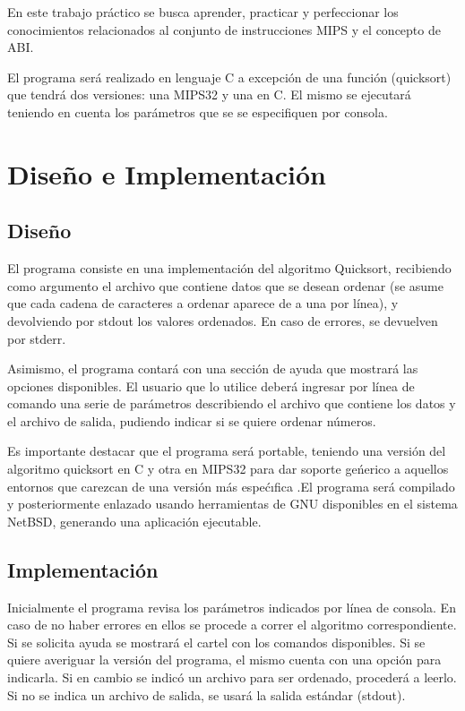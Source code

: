 \documentclass[a4paper,10pt]{article}
\numberwithin{equation}{section}
\numberwithin{figure}{section}
\begin{document}
En este trabajo práctico se busca aprender, practicar y perfeccionar los conocimientos relacionados al conjunto de instrucciones MIPS y el concepto de ABI.

El programa será realizado en lenguaje C a excepción de una función (quicksort) que tendrá dos versiones: una MIPS32 y una en C. El mismo se ejecutará teniendo en cuenta los parámetros que se se especifiquen por consola.



\section{Diseño e Implementación}

\subsection{Diseño}

El programa consiste en una implementación del algoritmo Quicksort, recibiendo como argumento el archivo que contiene datos que se desean ordenar (se asume que cada cadena de caracteres a ordenar aparece de a una por línea), y devolviendo por stdout los valores ordenados. En caso de errores, se devuelven por stderr. 

Asimismo, el programa contará con una sección de ayuda que mostrará las opciones disponibles. El usuario que lo utilice deberá ingresar por línea de comando una serie de parámetros describiendo el archivo que contiene los datos y el archivo de salida, pudiendo indicar si se quiere ordenar números.

Es importante destacar que el programa será portable, teniendo una versión del algoritmo quicksort en C y otra en MIPS32 para dar soporte geńerico a aquellos entornos que carezcan de una versión
más espećıfica .El programa será compilado y posteriormente enlazado usando herramientas de GNU disponibles en el sistema NetBSD, generando una aplicación ejecutable.


\subsection{Implementación}

Inicialmente el programa revisa los parámetros indicados por línea de consola. En caso de no haber errores en ellos se procede a correr el algoritmo correspondiente. Si se solicita ayuda se mostrará el cartel con los comandos disponibles. Si se quiere averiguar la versión del programa, el mismo cuenta con una opción para indicarla. Si en cambio se indicó un archivo para ser ordenado, procederá a leerlo. Si no se indica un archivo de salida, se usará la salida estándar (stdout).
\end{document}
